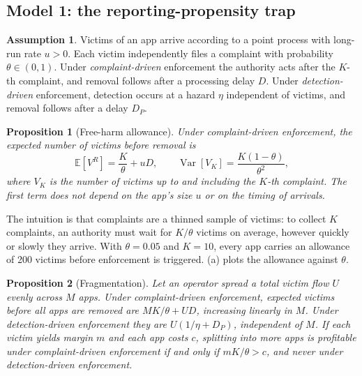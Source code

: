 \documentclass[11pt]{article}
\theoremstyle{plain}
\newtheorem{proposition}{Proposition}
\theoremstyle{definition}
\newtheorem{assumption}{Assumption}
\theoremstyle{remark}
\newcommand{\E}{\mathbb{E}}
\newcommand{\Var}{\operatorname{Var}}
\begin{document}
\subsection{Model 1: the reporting-propensity trap}

\begin{assumption}\label{ass:m1}
Victims of an app arrive according to a point process with long-run rate $u>0$. Each victim independently files a complaint with probability $\theta\in(0,1)$. Under \emph{complaint-driven} enforcement the authority acts after the $K$-th complaint, and removal follows after a processing delay $D$. Under \emph{detection-driven} enforcement, detection occurs at a hazard $\eta$ independent of victims, and removal follows after a delay $D_P$.
\end{assumption}

\begin{proposition}[Free-harm allowance]\label{prop:allowance}
Under complaint-driven enforcement, the expected number of victims before removal is
\begin{equation}
\E[V^R] = \frac{K}{\theta} + uD, \qquad \Var\!\left[V_K\right] = \frac{K(1-\theta)}{\theta^2},
\label{eq:allowance}
\end{equation}
where $V_K$ is the number of victims up to and including the $K$-th complaint. The first term does not depend on the app's size $u$ or on the timing of arrivals.
\end{proposition}

The intuition is that complaints are a thinned sample of victims: to collect $K$ complaints, an authority must wait for $K/\theta$ victims on average, however quickly or slowly they arrive. With $\theta = 0.05$ and $K = 10$, every app carries an allowance of 200 victims before enforcement is triggered. (a) plots the allowance against $\theta$.

\begin{proposition}[Fragmentation]\label{prop:fragment}
Let an operator spread a total victim flow $U$ evenly across $M$ apps. Under complaint-driven enforcement, expected victims before all apps are removed are $MK/\theta + UD$, increasing linearly in $M$. Under detection-driven enforcement they are $U(1/\eta + D_P)$, independent of $M$. If each victim yields margin $m$ and each app costs $c$, splitting into more apps is profitable under complaint-driven enforcement if and only if $mK/\theta > c$, and never under detection-driven enforcement.
\end{proposition}
\end{document}
